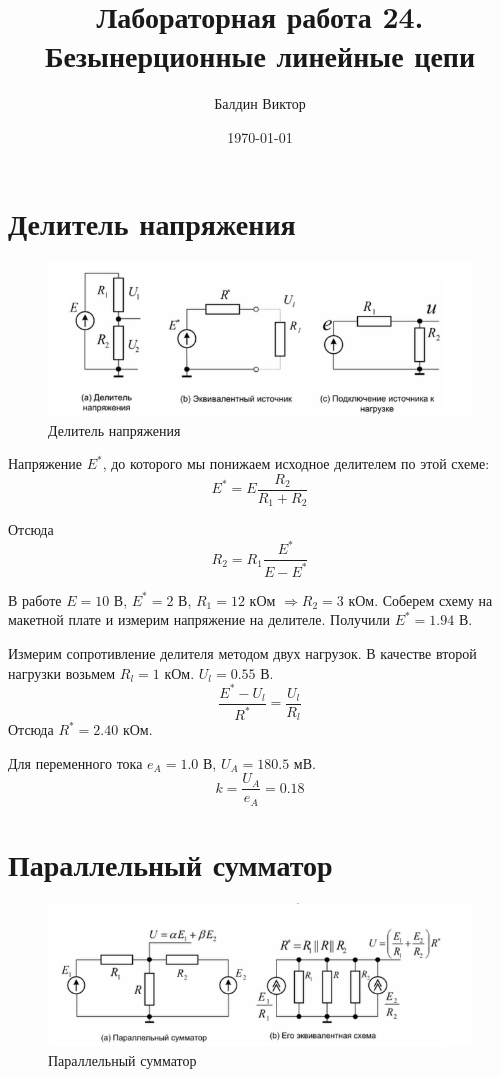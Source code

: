 \documentclass[a4paper, 12pt]{article}
\title{Лабораторная работа 24. \\ Безынерционные линейные цепи}
\author{Балдин Виктор}
\date{\today}
\begin{document}
\maketitle

\section{Делитель напряжения}
\begin{figure}[h]
  \centering
  \includegraphics[width=\textwidth]{delu.png}
  \caption{Делитель напряжения}
\end{figure}

Напряжение $E^{*}$, до которого мы понижаем исходное делителем по этой схеме:
\begin{equation}
  E^{*} = E\frac{R_2}{R_1 + R_2}
\end{equation}

Отсюда
\[ R_2 = R_1\frac{E^{*}}{E - E^{*}} \]

В работе $E=10$ В, $E^{*}=2$ В, $R_1 = 12$ кОм $\Rightarrow R_2 = 3$ кОм.
Соберем схему на макетной плате и измерим напряжение на делителе.
Получили $E^{*} = 1.94$ В.

Измерим сопротивление делителя методом двух нагрузок. В качестве второй нагрузки
возьмем $R_l = 1$ кОм. $U_l = 0.55$ В.
\begin{equation}
  \frac{E^{*} - U_l}{R^*} = \frac{U_l}{R_l}
  \label{2nagr}
\end{equation}
Отсюда $R^* = 2.40$ кОм.

Для переменного тока $e_A = 1.0$ В, $U_A = 180.5$ мВ.
\[ k = \frac{U_A}{e_A} = 0.18 \]

\newpage

\section{Параллельный сумматор}
\begin{figure}[h]
  \centering
  \includegraphics[width=\textwidth]{parsum.png}
  \caption{Параллельный сумматор}
\end{figure}
\end{document}
